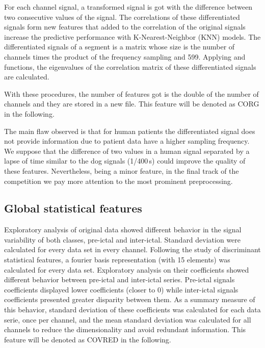 \documentclass[a4paper,english,twoside]{article}
\begin{document}
For each channel signal, a transformed signal is got with the difference between
two consecutive values of the signal.  The correlations of these differentiated
signals form new features that added to the correlation of the original signals
increase the predictive performance with K-Nearest-Neighbor (KNN) models. The
differentiated signals of a segment is a matrix whose size is the number of
channels times the product of the frequency sampling and 599. Applying
\verb@eigen@ and \verb@cor@ functions, the eigenvalues of the correlation matrix
of these differentiated signals are calculated.

With these procedures, the number of features got is the double of the number of
channels and they are stored in a new file. This feature will be denoted as CORG
in the following.

The main flaw observed is that for human patients the differentiated signal
does not provide information due to patient data have a higher sampling frequency. We
suppose that the difference of two values in a human signal separated by a lapse
of time similar to the dog signals (1/400\,s) could improve the quality of these
features.  Nevertheless, being a minor feature, in the final track of the
competition we pay more attention to the most prominent preprocessing.

\subsection{Global statistical
  features}\label{global-statistical-features}

Exploratory analysis of original data showed different behavior in the signal
variability of both classes, pre-ictal and inter-ictal. Standard deviation were
calculated for every data set in every channel.  Following the study of
discriminant statistical features, a fourier basis representation (with 15
elements) was calculated for every data set. Exploratory analysis on their
coefficients showed different behavior between pre-ictal and inter-ictal
series. Pre-ictal signals coefficients displayed lower coefficients (closer to
0) while inter-ictal signals coefficients presented greater disparity between
them. As a summary measure of this behavior, standard deviation of these
coefficients was calculated for each data serie, once per channel, and the mean
standard deviation was calculated for all channels to reduce the dimensionality
and avoid redundant information. This feature will be denoted as COVRED in the
following.
\end{document}
